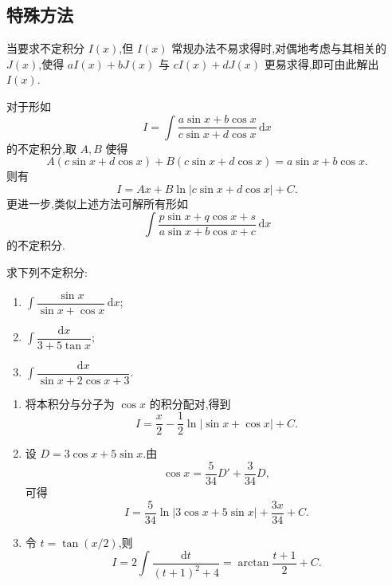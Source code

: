 \subsection{特殊方法}



当要求不定积分 $I(x)$,但 $I(x)$ 常规办法不易求得时,对偶地考虑与其相关的 $J(x)$,使得 $aI(x)+bJ(x)$ 与 $cI(x)+dJ(x)$ 更易求得,即可由此解出 $I(x)$.

\begin{proposition}[\markstar]
    对于形如
    \[
        I=\int\dfrac{a\sin x+b\cos x}{c\sin x+d\cos x}\,\mathrm{d}x
    \]
    的不定积分,取 $A,B$ 使得
    \[
        A(c\sin x+d\cos x)+B(c\sin x+d\cos x)
        =a\sin x+b\cos x.
    \]
    则有
    \[
        I=Ax+B\ln|c\sin x+d\cos x|+C.
    \]
    更进一步,类似上述方法可解所有形如
    \[
        \displaystyle\int\dfrac{p\sin x+q\cos x+s}{a\sin x+b\cos x+c}\,\mathrm{d}x
    \]
    的不定积分.
\end{proposition}

\begin{example}
    求下列不定积分:
    \begin{enumerate}
        \item $\displaystyle\int\dfrac{\sin x}{\sin x+\cos x}\,\mathrm{d}x$;
        \item $\displaystyle\int\dfrac{\mathrm{d}x}{3+5\tan x}$;
        \item $\displaystyle\int\dfrac{\mathrm{d}x}{\sin x+2\cos x+3}$.
    \end{enumerate}
\end{example}
\exampleblank

\begin{solution}
    \leavevmode
    \begin{enumerate}
        \item 将本积分与分子为 $\cos x$ 的积分配对,得到
              \[
                  I=\dfrac{x}{2}-\dfrac{1}{2}\ln|\sin x+\cos x|+C.
              \]
        \item 设 $D=3\cos x+5\sin x$.由
              \[
                  \cos x=\dfrac{5}{34}D'+\dfrac{3}{34}D,
              \]
              可得
              \[
                  I=\dfrac{5}{34}\ln|3\cos x+5\sin x|+\dfrac{3x}{34}+C.
              \]
        \item 令 $t=\tan(x/2)$,则
              \[
                  I=2\int\dfrac{\mathrm{d}t}{(t+1)^2+4}
                  =\arctan\dfrac{t+1}{2}+C.
              \]
    \end{enumerate}
\end{solution}

